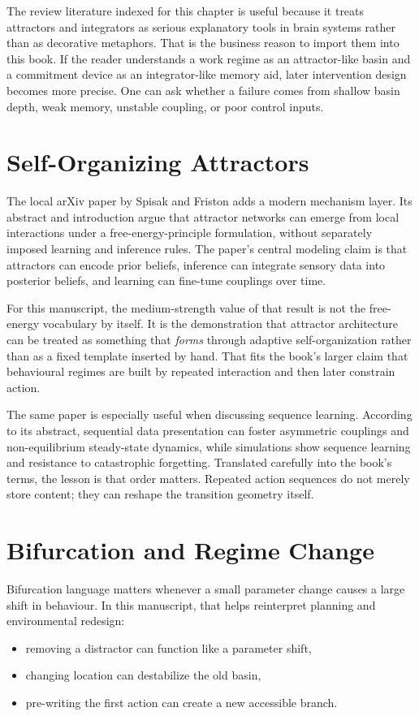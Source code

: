 The review literature indexed for this chapter is useful because it treats
attractors and integrators as serious explanatory tools in brain systems rather
than as decorative metaphors. That is the business reason to import them into
this book. If the reader understands a work regime as an attractor-like basin
and a commitment device as an integrator-like memory aid, later intervention
design becomes more precise. One can ask whether a failure comes from shallow
basin depth, weak memory, unstable coupling, or poor control inputs.

\section{Self-Organizing Attractors}

The local arXiv paper by Spisak and Friston adds a modern mechanism layer. Its
abstract and introduction argue that attractor networks can emerge from local
interactions under a free-energy-principle formulation, without separately
imposed learning and inference rules. The paper's central modeling claim is
that attractors can encode prior beliefs, inference can integrate sensory data
into posterior beliefs, and learning can fine-tune couplings over time.

For this manuscript, the medium-strength value of that result is not the
free-energy vocabulary by itself. It is the demonstration that attractor
architecture can be treated as something that \emph{forms} through adaptive
self-organization rather than as a fixed template inserted by hand. That fits
the book's larger claim that behavioural regimes are built by repeated
interaction and then later constrain action.

The same paper is especially useful when discussing sequence learning.
According to its abstract, sequential data presentation can foster asymmetric
couplings and non-equilibrium steady-state dynamics, while simulations show
sequence learning and resistance to catastrophic forgetting. Translated
carefully into the book's terms, the lesson is that order matters. Repeated
action sequences do not merely store content; they can reshape the transition
geometry itself.

\section{Bifurcation and Regime Change}

Bifurcation language matters whenever a small parameter change causes a large
shift in behaviour. In this manuscript, that helps reinterpret planning and
environmental redesign:
\begin{itemize}[nosep]
  \item removing a distractor can function like a parameter shift,
  \item changing location can destabilize the old basin,
  \item pre-writing the first action can create a new accessible branch.
\end{itemize}

